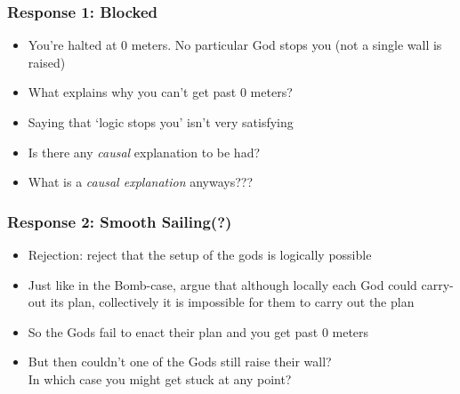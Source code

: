 \begin{frame}
\frametitle{Response 1: Blocked}

\begin{itemize}[<+->]

\item You're halted at $0$ meters. No particular God stops you (not a single wall is raised)

\item What explains why you can't get past $0$ meters?

\item Saying that `logic stops you' isn't very satisfying

\item Is there any \textit{causal} explanation to be had?

\item What is a \textit{causal explanation} anyways???



\end{itemize}
\end{frame}

\begin{frame}
\frametitle{Response 2: Smooth Sailing(?)}

\begin{itemize}[<+->]

\item Rejection: reject that the setup of the gods is logically possible

\item Just like in the Bomb-case, argue that although locally each God could carry-out its plan, collectively it is impossible for them to carry out the plan

\item So the Gods fail to enact their plan and you get past $0$ meters

\item But then couldn't one of the Gods still raise their wall? \\ In which case you might get stuck at any point? 

\end{itemize}
\end{frame}




